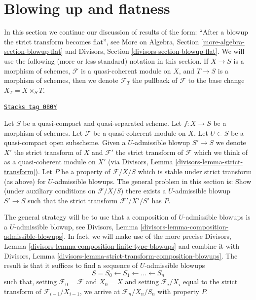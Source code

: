 \section{Blowing up and flatness}
\label{flat-section-blowup-flat}
In this section we continue our discussion of results of the form: ``After a
blowup the strict transform becomes flat'', see
More on Algebra, Section \ref{more-algebra-section-blowup-flat} and
Divisors, Section \ref{divisors-section-blowup-flat}.
We will use the following
(more or less standard) notation in this section. If $X \to S$ is
a morphism of schemes, $\mathcal{F}$ is a quasi-coherent module
on $X$, and $T \to S$ is a morphism of schemes, then we denote
$\mathcal{F}_T$ the pullback of $\mathcal{F}$ to the base change
$X_T = X \times_S T$.

\begin{remark}
\label{flat-remark-successive-blowups}
\href{https://stacks.math.columbia.edu/tag/080Y}{\texttt{Stacks tag 080Y}}

Let $S$ be a quasi-compact and quasi-separated scheme. Let $f : X \to S$
be a morphism of schemes. Let $\mathcal{F}$ be a quasi-coherent module on $X$.
Let $U \subset S$ be a quasi-compact open subscheme. Given a $U$-admissible
blowup $S' \to S$ we denote $X'$ the strict transform of $X$ and $\mathcal{F}'$
the strict transform of $\mathcal{F}$ which we think of as a quasi-coherent
module on $X'$ (via Divisors, Lemma \ref{divisors-lemma-strict-transform}).
Let $P$ be a property of $\mathcal{F}/X/S$ which is stable under strict
transform (as above) for $U$-admissible blowups. The general problem in
this section is: Show (under auxiliary conditions on $\mathcal{F}/X/S$)
there exists a $U$-admissible blowup $S' \to S$
such that the strict transform $\mathcal{F}'/X'/S'$ has $P$.

\medskip\noindent
The general strategy will be to use that a composition of
$U$-admissible blowups is a $U$-admissible blowup, see
Divisors, Lemma \ref{divisors-lemma-composition-admissible-blowups}.
In fact, we will make use of the more precise
Divisors, Lemma \ref{divisors-lemma-composition-finite-type-blowups}
and combine it with
Divisors, Lemma \ref{divisors-lemma-strict-transform-composition-blowups}.
The result is that it suffices to find a sequence of $U$-admissible
blowups
$$
S = S_0 \leftarrow S_1 \leftarrow \ldots \leftarrow S_n
$$
such that, setting $\mathcal{F}_0 = \mathcal{F}$ and $X_0 = X$ and setting
$\mathcal{F}_i/X_i$ equal to the strict transform of
$\mathcal{F}_{i - 1}/X_{i - 1}$, we
arrive at $\mathcal{F}_n/X_n/S_n$ with property $P$.


\end{remark}
